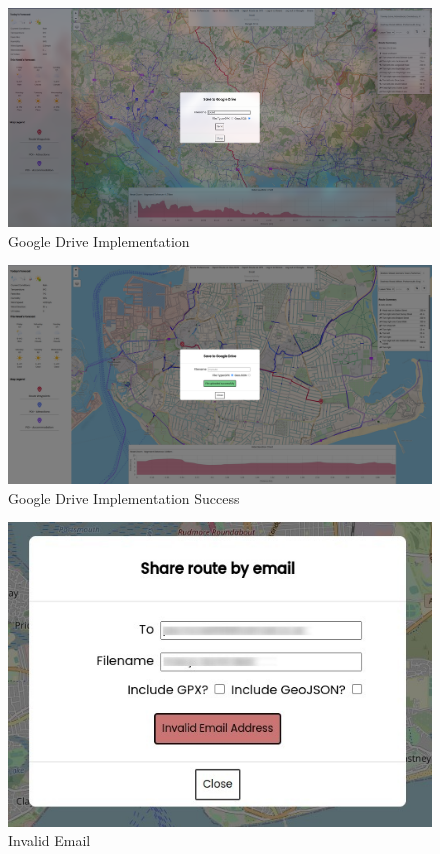 \begin{figure}[!ht]
    \centering
    \includegraphics[width=425px]{figures/Progress Images/Iteration-2/SR15/SR15 - Save to GDrive Modal working.png}
    \caption{Google Drive Implementation}
    \label{fig:gdrive}
\end{figure}

\begin{figure}[!ht]
    \centering
    \includegraphics[width=425px]{figures/Progress Images/Iteration-2/SR15/SR15 - Success.png}
    \caption{Google Drive Implementation Success}
    \label{fig:gdrive-success}
\end{figure}

\begin{figure}[!ht]
    \centering
    \includegraphics[width=425px]{figures/Progress Images/Iteration-2/SR17/SR17 Invalid Email.png}
    \caption{Invalid Email}
    \label{fig:invalid-email}
\end{figure}

